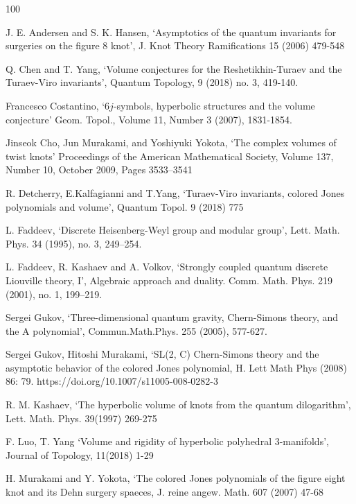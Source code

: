 \documentclass[10pt,a4paper]{article}
\begin{document}
\begin{thebibliography}{100}

  J. E. Andersen and S. K. Hansen,
  `Asymptotics of the quantum invariants for surgeries on the figure 8 knot',
  J. Knot Theory Ramifications 15 (2006) 479-548

  Q. Chen and T. Yang,
  `Volume conjectures for the Reshetikhin-Turaev and the Turaev-Viro invariants',
  Quantum Topology, 9 (2018) no. 3, 419-140. 

  Francesco Costantino,
  `6$j$-symbols, hyperbolic structures and the volume conjecture'
  Geom. Topol., Volume 11, Number 3 (2007), 1831-1854.
  
  Jinseok Cho, Jun Murakami, and Yoshiyuki Yokota,
  `The complex volumes of twist knots'
  Proceedings of the American Mathematical Society, Volume 137, Number 10, October 2009, Pages 3533–3541

  R. Detcherry, E.Kalfagianni and T.Yang,
  `Turaev-Viro invariants, colored Jones polynomials and volume',
   Quantum Topol. 9 (2018) 775

  L. Faddeev, 
  `Discrete Heisenberg-Weyl group and modular group',
  Lett. Math. Phys. 34 (1995), no. 3, 249–254.

  L. Faddeev, R. Kashaev and A. Volkov, 
  `Strongly coupled quantum discrete Liouville theory, I',
  Algebraic approach and duality. Comm. Math. Phys. 219 (2001), no. 1, 199–219.

  Sergei Gukov, 
  `Three-dimensional quantum gravity, Chern-Simons theory, and the A polynomial',
  Commun.Math.Phys. 255 (2005), 577-627.
  
  Sergei Gukov, Hitoshi Murakami, 
  `SL(2, C) Chern-Simons theory and the asymptotic behavior of the colored Jones polynomial, 
   H. Lett Math Phys (2008) 86: 79. https://doi.org/10.1007/s11005-008-0282-3
   
  R. M. Kashaev,
  `The hyperbolic volume of knots from the quantum dilogarithm',
   Lett. Math. Phys. 39(1997) 269-275
   
  F. Luo, T. Yang
  `Volume and rigidity of hyperbolic polyhedral 3-manifolds',
   Journal of Topology, 11(2018) 1-29
      
  H. Murakami and Y. Yokota,
  `The colored Jones polynomials of the figure eight knot and its Dehn surgery spaeces,
  J. reine angew. Math. 607 (2007) 47-68


\end{thebibliography}
\end{document}
